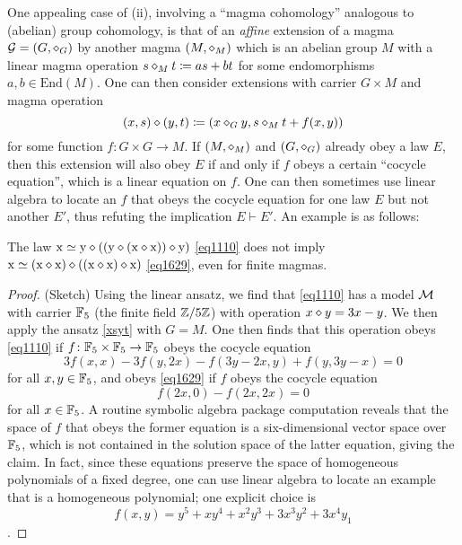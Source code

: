 One appealing case of (ii), involving a ``magma cohomology'' analogous to (abelian) group cohomology, is that of an \emph{affine} extension of a magma ${\mathcal G} = (G,\diamond_G)$ by another magma $(M,\diamond_M)$ which is an abelian group $M$ with a linear magma operation $s \diamond_M t \coloneqq as + bt$ for some endomorphisms $a,b \in \mathrm{End}(M)$.  One can then consider extensions with carrier $G \times M$ and magma operation
\begin{equation}\label{xsyt}
 (x, s) \diamond (y, t) \coloneqq (x \diamond_G y, s \diamond_M t + f(x,y))
\end{equation}
for some function $f \colon G \times G \to M$.  If $(M,\diamond_M)$ and $(G,\diamond_G)$ already obey a law $E$, then this extension will also obey $E$ if and only if $f$ obeys a certain ``cocycle equation'', which is a linear equation on $f$.  One can then sometimes use linear algebra to locate an $f$ that obeys the cocycle equation for one law $E$ but not another $E'$, thus refuting the implication $E \vdash E'$.  An example is as follows:

\begin{proposition}\label{1110-1629} The law $\mathrm{x} \simeq \mathrm{y} \diamond ((\mathrm{y} \diamond (\mathrm{x} \diamond \mathrm{x})) \diamond \mathrm{y})$ \eqref{eq1110} does not imply $\mathrm{x} \simeq (\mathrm{x} \diamond \mathrm{x}) \diamond ((\mathrm{x} \diamond \mathrm{x}) \diamond \mathrm{x})$ \eqref{eq1629}, even for finite magmas.
\end{proposition}

\begin{proof}  (Sketch) Using the linear ansatz, we find that \eqref{eq1110} has a model ${\mathcal{M}}$ with carrier $\mathbb{F}_5$ (the finite field $\mathbb{Z}/5\mathbb{Z}$) with operation $x \diamond y = 3x-y$.  We then apply the ansatz \eqref{xsyt} with $G=M$.  One then finds that this operation obeys \eqref{eq1110} if $f \colon \mathbb{F}_5 \times \mathbb{F}_5 \to \mathbb{F}_5$ obeys the cocycle equation
  $$3f(x,x) - 3f(y,2x) - f(3y-2x,y) + f(y,3y-x) = 0$$
for all $x,y \in \mathbb{F}_5$, and obeys \eqref{eq1629} if $f$ obeys the cocycle equation
$$ f(2x,0) - f(2x,2x) = 0$$
for all $x \in \mathbb{F}_5$.  A routine symbolic algebra package computation reveals that the space of $f$ that obeys the former equation is a six-dimensional vector space over $\mathbb{F}_5$, which is not contained in the solution space of the latter equation, giving the claim.
In fact, since these equations preserve the space of homogeneous polynomials of a fixed degree, one can use linear algebra to locate an example that is a homogeneous polynomial; one explicit choice is $$f(x,y) = y^5 +xy^4 + x^2y^3 +3x^3 y^2 + 3x^4 y_1$$.
\end{proof}


